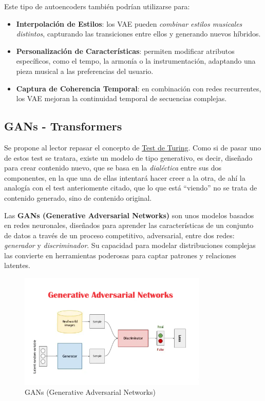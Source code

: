 Este tipo de autoencoders también podrían utilizarse para:
\begin{itemize}
    \item \textbf{Interpolación de Estilos}: los VAE pueden \emph{combinar estilos musicales distintos}, capturando las transiciones entre ellos y generando nuevos híbridos.
    \item \textbf{Personalización de Características}: permiten modificar atributos específicos, como el tempo, la armonía o la instrumentación, adaptando una pieza musical a las preferencias del usuario.
    \item \textbf{Captura de Coherencia Temporal}: en combinación con redes recurrentes, los VAE mejoran la continuidad temporal de secuencias complejas.
\end{itemize}

\subsection{GANs - Transformers}

Se propone al lector repasar el concepto de \href{https://es.wikipedia.org/wiki/Prueba_de_Turing}{Test de Turing}. Como si de pasar uno de estos test se tratara, existe un modelo de tipo generativo, es decir, diseñado para crear contenido nuevo, que se basa en la \emph{dialéctica} entre sus dos componentes, en la que una de ellas intentará hacer creer a la otra, de ahí la analogía con el test anteriomente citado, que lo que está ``viendo'' no se trata de contenido generado, sino de contenido original.

Las \textbf{GANs (Generative Adversarial Networks)} son unos modelos basados en redes neuronales, diseñados para aprender las características de un conjunto de datos a través de un proceso competitivo, adversarial, entre dos redes: \textit{generador} y \textit{discriminador}. Su capacidad para modelar distribuciones complejas las convierte en herramientas poderosas para captar patrones y relaciones latentes.

\begin{figure}[H]
  \centering
  \includegraphics[width=0.8\textwidth]{images/gan.png}
  \caption{GANs (Generative Adversarial Networks)}
  \label{fig:gan}
\end{figure}

